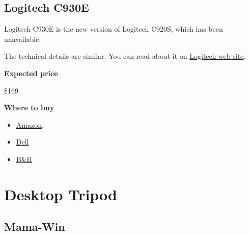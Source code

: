 \subsection{Logitech C930E}
\label{sec:equipment::logitech-930}
\begin{gram}
\label{grm:equipment::logitech-930::main}
Logitech C930E is the new version of Logitech C920S, which has been unavailable.

The technical details are similar.  You can read about it on
%
\href{https://www.logitech.com/en-us/product/c930e-webcam}{Logitech web site}.

\textbf{Expected price}

\$169

\textbf{Where to buy}

\begin{itemize}
\item
\href{https://www.amazon.com/Logitech-C930e-1080P-Video-Webcam/dp/B00CRJWW2G}{Amazon}.
\item 
\href{https://www.dell.com/en-ca/work/shop/logitech-c930e-hd-webcam/apd/a6880908/pc-accessories}{Dell}
\item
\href{https://www.bhphotovideo.com/c/product/977620-REG/logitech_960_000971_c930e_webcam_usb.html}{B\&H}
\end{itemize}

\end{gram}

\section{Desktop Tripod}
\label{sec:equipment::tripod}

\subsection{Mama-Win}
\label{sec:equipment::tripod::mamawin}

